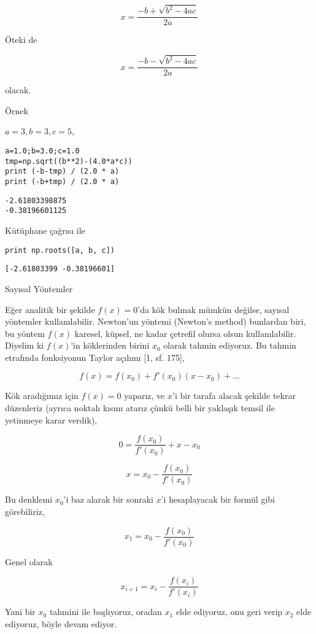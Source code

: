 \documentclass[12pt,fleqn]{article}\usepackage{../../common}
\begin{document}
$$ x = \frac{-b + \sqrt{b^2-4ac}}{2a} $$

Öteki de 

$$ x = \frac{-b - \sqrt{b^2-4ac}}{2a} $$

olacak.

Örnek

$a=3,b=3,c=5$, 

\begin{verbatim}
a=1.0;b=3.0;c=1.0
tmp=np.sqrt((b**2)-(4.0*a*c))
print (-b-tmp) / (2.0 * a)
print (-b+tmp) / (2.0 * a)
\end{verbatim}

\begin{verbatim}
-2.61803398875
-0.38196601125
\end{verbatim}

Kütüphane çağrısı ile

\begin{verbatim}
print np.roots([a, b, c])
\end{verbatim}

\begin{verbatim}
[-2.61803399 -0.38196601]
\end{verbatim}

Sayısal Yöntemler

Eğer analitik bir şekilde $f(x)=0$'da kök bulmak mümkün değilse, sayısal
yöntemler kullanılabilir. Newton'un yöntemi (Newton's method) bunlardan
biri, bu yöntem $f(x)$ karesel, küpsel, ne kadar çetrefil olursa olsun
kullanılabilir. Diyelim ki $f(x)$'in köklerinden birini $x_0$ olarak
tahmin ediyoruz. Bu tahmin etrafında fonksiyonun Taylor açılımı [1,
sf. 175],

$$ f(x) = f(x_0) + f'(x_0)(x-x_0) + ...$$

Kök aradığımız için $f(x)=0$ yaparız, ve $x$'i bir tarafa alacak şekilde
tekrar düzenleriz (ayrıca noktalı kısmı atarız çünkü belli bir yaklaşık
temsil ile yetinmeye karar verdik), 

$$ 0 = \frac{f(x_0)}{f'(x_0)} + x-x_0$$

$$ x = x_0 - \frac{f(x_0)}{f'(x_0)} $$

Bu denklemi $x_0$'i baz alarak bir sonraki $x$'i hesaplayacak bir formül
gibi görebiliriz, 

$$ x_1 = x_0 - \frac{f(x_0)}{f'(x_0)} $$

Genel olarak

$$ x_{i+1} = x_i - \frac{f(x_i)}{f'(x_i)} $$

Yani bir $x_0$ tahmini ile başlıyoruz, oradan $x_1$ elde ediyoruz, onu geri
verip $x_2$ elde ediyoruz, böyle devam ediyor.
\end{document}
